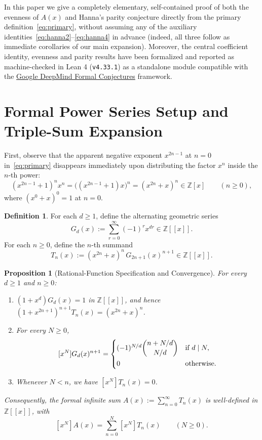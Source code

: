 \documentclass[11pt,a4paper]{article}
\newtheorem{proposition}[theorem]{Proposition}
\theoremstyle{definition}
\newtheorem{definition}[theorem]{Definition}
\theoremstyle{remark}
\newcommand{\Z}{\mathbb{Z}}
\newcommand{\coeff}[1]{[x^{#1}]}
\begin{document}
In this paper we give a completely elementary, self-contained proof of both the evenness of $A(x)$ and Hanna's parity conjecture directly from the primary definition~\eqref{eq:primary}, without assuming any of the auxiliary identities~\eqref{eq:hanna2}--\eqref{eq:hanna4} in advance (indeed, all three follow as immediate corollaries of our main expansion). Moreover, the central coefficient identity, evenness and parity results have been formalized and reported as machine-checked in Lean 4 (\texttt{v4.33.1}) as a standalone module compatible with the \href{https://github.com/google-deepmind/formal-conjectures}{Google DeepMind Formal Conjectures} framework.

\section{Formal Power Series Setup and Triple-Sum Expansion}

First, observe that the apparent negative exponent $x^{2n-1}$ at $n=0$ in~\eqref{eq:primary} disappears immediately upon distributing the factor $x^n$ inside the $n$-th power:
\[
(x^{2n-1} + 1)^n x^n = \bigl((x^{2n-1} + 1) x\bigr)^n = (x^{2n} + x)^n \in \Z[x] \qquad (n \ge 0),
\]
where $(x^0 + x)^0 = 1$ at $n = 0$.

\begin{definition}\label{def:series}
For each $d \ge 1$, define the alternating geometric series
\[
G_d(x) := \sum_{r=0}^{\infty} (-1)^r x^{dr} \in \Z[[x]].
\]
For each $n \ge 0$, define the $n$-th summand
\[
T_n(x) := (x^{2n} + x)^n \, G_{2n+1}(x)^{n+1} \in \Z[[x]].
\]
\end{definition}

\begin{proposition}[Rational-Function Specification and Convergence]\label{prop:conv}
For every $d \ge 1$ and $n \ge 0$:
\begin{enumerate}
\item $(1 + x^d) G_d(x) = 1$ in $\Z[[x]]$, and hence $(1 + x^{2n+1})^{n+1} T_n(x) = (x^{2n} + x)^n$.
\item For every $N \ge 0$,
\begin{equation}\label{eq:geom_pow}
\coeff{N} G_d(x)^{n+1} =
\begin{cases}
(-1)^{N/d} \dbinom{n + N/d}{N/d} & \text{if } d \mid N,\\[8pt]
0 & \text{otherwise.}
\end{cases}
\end{equation}
\item Whenever $N < n$, we have $\coeff{N} T_n(x) = 0$.
\end{enumerate}
Consequently, the formal infinite sum $A(x) := \sum_{n=0}^{\infty} T_n(x)$ is well-defined in $\Z[[x]]$, with
\[
\coeff{N} A(x) = \sum_{n=0}^{N} \coeff{N} T_n(x) \qquad (N \ge 0).
\]
\end{proposition}
\end{document}
